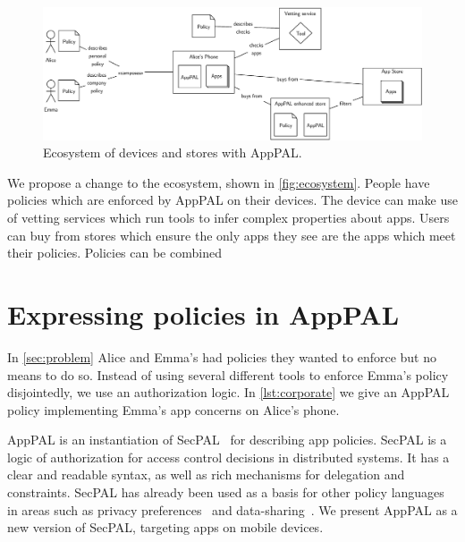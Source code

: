 \documentclass[]{llncs}
\begin{document}
\begin{figure}
\includegraphics{figures/overview.eps}
\caption{Ecosystem of devices and stores with AppPAL.}
\label{fig:ecosystem}
\end{figure}

We propose a change to the ecosystem, shown in \autoref{fig:ecosystem}.
People have policies which are enforced by AppPAL on their devices.
The device can make use of vetting services which run tools to infer complex properties about apps.
Users can buy from stores which ensure the only apps they see are the apps which meet their policies.
Policies can be combined

\section{Expressing policies in AppPAL}
\label{sec:idea}

In \autoref{sec:problem} Alice and Emma's had policies they wanted to enforce but no means to do so.
Instead of using several different tools to enforce Emma's policy disjointedly, we use an authorization logic.
In \autoref{lst:corporate} we give an AppPAL policy implementing Emma's app concerns on Alice's phone.

AppPAL is an instantiation of SecPAL~\cite{Becker:2006vh} for describing app policies.
SecPAL is a logic of authorization for access control decisions in distributed systems.
It has a clear and readable syntax, as well as rich mechanisms for delegation and constraints.
SecPAL has already been used as a basis for other policy languages in areas such as privacy preferences~\cite{Becker:2009ula} and data-sharing~\cite{Aziz:2011vt}.
We present AppPAL as a new version of SecPAL, targeting apps on mobile devices.
\end{document}
